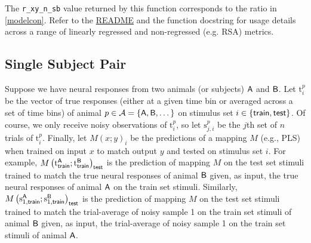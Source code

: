 The \texttt{r\_xy\_n\_sb} value returned by this function corresponds to the ratio in \eqref{modelcon}.
Refer to the
\href{https://github.com/neuroagents-lab/brainmodel_utils#readme}{README} and the function docstring for usage details across a range of linearly regressed and non-regressed (e.g. RSA) metrics.

\subsection{Single Subject Pair}
\label{ss:methods-interanimal-pair}
Suppose we have neural responses from two animals (or subjects) $\mathsf{A}$ and $\mathsf{B}$.
Let $\mathrm{t}_i^p$ be the vector of true responses (either at a given time bin or averaged across a set of time bins) of animal $p \in \mathcal{A} = \{\mathsf{A},\mathsf{B},\dots\}$ on stimulus set $i \in \{\operatorname{\mathsf{train}}, \operatorname{\mathsf{test}}\}$.
Of course, we only receive noisy observations of $\mathrm{t}_i^p$, so let $\mathrm{s}_{j,i}^p$ be the $j$th set of $n$ trials of $\mathrm{t}_i^p$.
Finally, let $M(x;y)_i$ be the predictions of a mapping $M$ (e.g., PLS) when trained on input $x$ to match output $y$ and tested on stimulus set $i$.
For example, $M\left(\operatorname{t^{\mathsf{A}}_{\operatorname{\mathsf{train}}}};\operatorname{t^{\mathsf{B}}_{\operatorname{\mathsf{train}}}}\right)_{\operatorname{\mathsf{test}}}$ is the prediction of mapping $M$ on the test set stimuli trained to match the true neural responses of animal $\mathsf{B}$ given, as input, the true neural responses of animal $\mathsf{A}$ on the train set stimuli.
Similarly, $M\left(\operatorname{s^{\mathsf{A}}_{1,\operatorname{\mathsf{train}}}};\operatorname{s^{\mathsf{B}}_{1,\operatorname{\mathsf{train}}}}\right)_{\operatorname{\mathsf{test}}}$ is the prediction of mapping $M$ on the test set stimuli trained to match the trial-average of noisy sample 1 on the train set stimuli of animal $\mathsf{B}$ given, as input, the trial-average of noisy sample 1 on the train set stimuli of animal $\mathsf{A}$.

